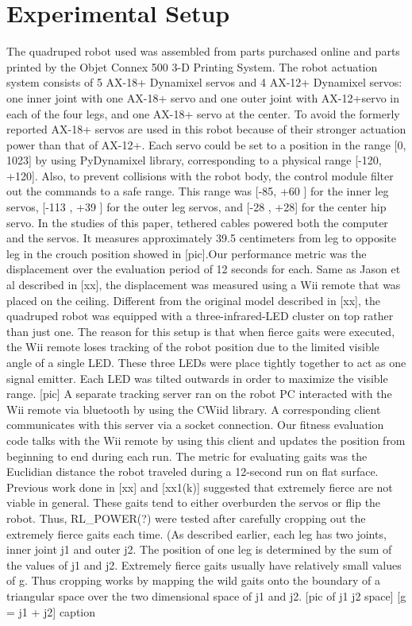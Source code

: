 \section{Experimental Setup}

The quadruped robot used was assembled from parts purchased online and
parts printed by the Objet Connex 500 3-D Printing System. The robot
actuation system consists of 5 AX-18+ Dynamixel servos and 4 AX-12+
Dynamixel servos: one inner joint with one AX-18+ servo and one outer
joint with AX-12+servo in each of the four legs, and one AX-18+ servo
at the center. To avoid the formerly reported AX-18+ servos are used
in this robot because of their stronger actuation power than that of
AX-12+. Each servo could be set to a position in the range [0, 1023]
by using PyDynamixel library, corresponding to a physical range [-120,
  +120]. Also, to prevent collisions with the robot body, the control
module filter out the commands to a safe range. This range was [-85,
  +60 ] for the inner leg servos, [-113 , +39 ] for the outer leg
servos, and [-28 , +28] for the center hip servo. In the studies of
this paper, tethered cables powered both the computer and the
servos. It measures approximately 39.5 centimeters from leg to
opposite leg in the crouch position showed in [pic].Our performance
metric was the displacement over the evaluation period of 12 seconds
for each. Same as Jason et al described in [xx], the displacement was
measured using a Wii remote that was placed on the ceiling. Different
from the original model described in [xx], the quadruped robot was
equipped with a three-infrared-LED cluster on top rather than just
one. The reason for this setup is that when fierce gaits were
executed, the Wii remote loses tracking of the robot position due to
the limited visible angle of a single LED.  These three LEDs were
place tightly together to act as one signal emitter. Each LED was
tilted outwards in order to maximize the visible range. [pic] A
separate tracking server ran on the robot PC interacted with the Wii
remote via bluetooth by using the CWiid library.  A corresponding
client communicates with this server via a socket connection. Our
fitness evaluation code talks with the Wii remote by using this client
and updates the position from beginning to end during each run. The
metric for evaluating gaits was the Euclidian distance the robot
traveled during a 12-second run on flat surface. Previous work done in
[xx] and [xx1(k)] suggested that extremely fierce are not viable in
general. These gaits tend to either overburden the servos or flip the
robot. Thus, RL\_POWER(?) were tested after carefully cropping out the
extremely fierce gaits each time. (As described earlier, each leg has
two joints, inner joint j1 and outer j2. The position of one leg is
determined by the sum of the values of j1 and j2. Extremely fierce
gaits usually have relatively small values of g. Thus cropping works
by mapping the wild gaits onto the boundary of a triangular space over
the two dimensional space of j1 and j2. [pic of j1 j2 space] [g = j1 +
  j2] caption

